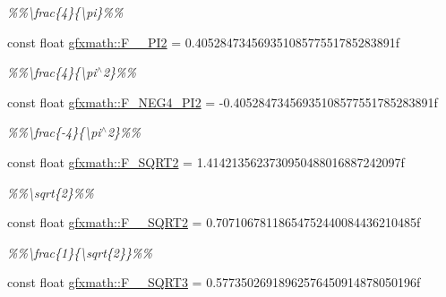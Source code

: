 \begin{DoxyCompactItemize}
\begin{DoxyCompactList}\small\item\em \%\%\textbackslash{}frac\{4\}\{\textbackslash{}pi\}\%\% \end{DoxyCompactList}\item 
\hypertarget{group___math_consts_ga0eddee00e29a22722352a3d22728d807}{}const float \hyperlink{group___math_consts_ga0eddee00e29a22722352a3d22728d807}{gfxmath\+::\+F\+\_\+\_\+\+P\+I2} = 0.\+40528473456935108577551785283891f\label{group___math_consts_ga0eddee00e29a22722352a3d22728d807}

\begin{DoxyCompactList}\small\item\em \%\%\textbackslash{}frac\{4\}\{\textbackslash{}pi$^\wedge$2\}\%\% \end{DoxyCompactList}\item 
\hypertarget{group___math_consts_ga197e5a6509678e965eefa2f9dbc395c6}{}const float \hyperlink{group___math_consts_ga197e5a6509678e965eefa2f9dbc395c6}{gfxmath\+::\+F\+\_\+\+N\+E\+G4\+\_\+\+P\+I2} = -\/0.\+40528473456935108577551785283891f\label{group___math_consts_ga197e5a6509678e965eefa2f9dbc395c6}

\begin{DoxyCompactList}\small\item\em \%\%\textbackslash{}frac\{-\/4\}\{\textbackslash{}pi$^\wedge$2\}\%\% \end{DoxyCompactList}\item 
\hypertarget{group___math_consts_ga43677e4b78975d594a04bc8dadedbc60}{}const float \hyperlink{group___math_consts_ga43677e4b78975d594a04bc8dadedbc60}{gfxmath\+::\+F\+\_\+\+S\+Q\+R\+T2} = 1.\+4142135623730950488016887242097f\label{group___math_consts_ga43677e4b78975d594a04bc8dadedbc60}

\begin{DoxyCompactList}\small\item\em \%\%\textbackslash{}sqrt\{2\}\%\% \end{DoxyCompactList}\item 
\hypertarget{group___math_consts_ga068bdf7e4cc23958b4a0ff5807e830b9}{}const float \hyperlink{group___math_consts_ga068bdf7e4cc23958b4a0ff5807e830b9}{gfxmath\+::\+F\+\_\+\_\+\+S\+Q\+R\+T2} = 0.\+70710678118654752440084436210485f\label{group___math_consts_ga068bdf7e4cc23958b4a0ff5807e830b9}

\begin{DoxyCompactList}\small\item\em \%\%\textbackslash{}frac\{1\}\{\textbackslash{}sqrt\{2\}\}\%\% \end{DoxyCompactList}\item 
\hypertarget{group___math_consts_gad8ae4d5759b4629d01fb9f58a4b4b331}{}const float \hyperlink{group___math_consts_gad8ae4d5759b4629d01fb9f58a4b4b331}{gfxmath\+::\+F\+\_\+\_\+\+S\+Q\+R\+T3} = 0.\+57735026918962576450914878050196f\label{group___math_consts_gad8ae4d5759b4629d01fb9f58a4b4b331}


\end{DoxyCompactItemize}
